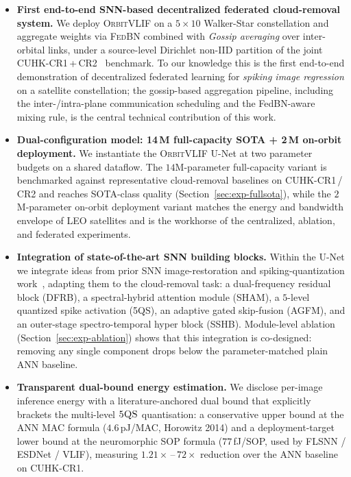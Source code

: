 \documentclass[conference]{IEEEtran}
\newcommand{\OrbitVLIF}{\textsc{OrbitVLIF}}
\newcommand{\DFRB}{\textsc{DFRB}}
\newcommand{\SSHB}{\textsc{SSHB}}
\newcommand{\SHAM}{\textsc{SHAM}}
\newcommand{\FQS}{\textsc{5QS}}
\newcommand{\AGFM}{\textsc{AGFM}}
\begin{document}
\begin{itemize}
\item \textbf{First end-to-end SNN-based decentralized federated
  cloud-removal system.}\;\;
  We deploy \OrbitVLIF{} on a $5\!\times\!10$ Walker-Star
  constellation and aggregate weights via \textsc{FedBN} combined
  with \emph{Gossip averaging} over inter-orbital links, under a
  source-level Dirichlet non-IID partition of the joint
  CUHK-CR1\,+\,CR2~\cite{ref:cuhkcr} benchmark. To our knowledge
  this is the first end-to-end demonstration of decentralized
  federated learning for \emph{spiking image regression} on a
  satellite constellation; the gossip-based aggregation pipeline,
  including the inter-/intra-plane communication scheduling and
  the FedBN-aware mixing rule, is the central technical
  contribution of this work.

\item \textbf{Dual-configuration model: 14\,M full-capacity SOTA
  + 2\,M on-orbit deployment.}\;\;
  We instantiate the \OrbitVLIF{} U-Net at two parameter budgets
  on a shared dataflow.  The $14$M-parameter full-capacity variant
  is benchmarked against representative cloud-removal baselines on
  CUHK-CR1\,/\,CR2 and reaches SOTA-class quality
  (Section~\ref{sec:exp-fullsota}), while the $2$M-parameter
  on-orbit deployment variant matches the energy and bandwidth
  envelope of LEO satellites and is the workhorse of the
  centralized, ablation, and federated experiments.

\item \textbf{Integration of state-of-the-art SNN building
  blocks.}\;\;
  Within the U-Net we integrate ideas from prior SNN
  image-restoration and spiking-quantization
  work~\cite{ref:fsta-snn, ref:esdnet, ref:darkir}, adapting them
  to the cloud-removal task: a dual-frequency residual block
  (\DFRB), a spectral-hybrid attention module (\SHAM), a
  $5$-level quantized spike activation (\FQS), an adaptive gated
  skip-fusion (\AGFM), and an outer-stage spectro-temporal hyper
  block (\SSHB). Module-level ablation
  (Section~\ref{sec:exp-ablation}) shows that
  this integration is co-designed: removing any single component
  drops below the parameter-matched plain ANN baseline.

\item \textbf{Transparent dual-bound energy estimation.}\;\;
  We disclose per-image inference energy with a
  literature-anchored dual bound that explicitly brackets the
  multi-level $\FQS$ quantisation: a conservative upper bound at
  the ANN MAC formula ($4.6$\,pJ/MAC, Horowitz 2014) and a
  deployment-target lower bound at the neuromorphic SOP formula
  ($77$\,fJ/SOP, used by FLSNN / ESDNet / VLIF), measuring
  $1.21\!\times\!$\,--\,$72\!\times\!$ reduction over the ANN
  baseline on CUHK-CR1.
\end{itemize}
\end{document}
